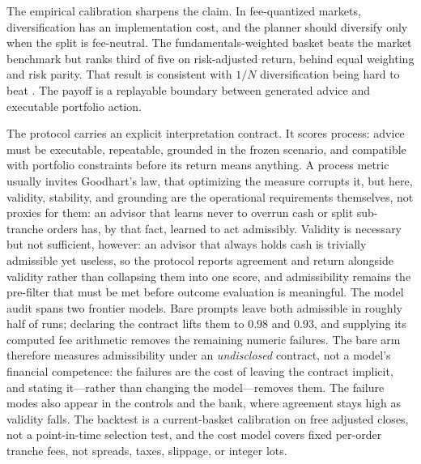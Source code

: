 \documentclass[sigconf,review,anonymous]{acmart}
\begin{document}
The empirical calibration sharpens the claim. In fee-quantized markets, diversification has an implementation cost, and the planner should diversify only when the split is fee-neutral. The fundamentals-weighted basket beats the market benchmark but ranks third of five on risk-adjusted return, behind equal weighting and risk parity. That result is consistent with $1/N$ diversification being hard to beat \cite{demiguel2009naive}. The payoff is a replayable boundary between generated advice and executable portfolio action.

The protocol carries an explicit interpretation contract. It scores process: advice must be executable, repeatable, grounded in the frozen scenario, and compatible with portfolio constraints before its return means anything. A process metric usually invites Goodhart's law, that optimizing the measure corrupts it, but here, validity, stability, and grounding are the operational requirements themselves, not proxies for them: an advisor that learns never to overrun cash or split sub-tranche orders has, by that fact, learned to act admissibly. Validity is necessary but not sufficient, however: an advisor that always holds cash is trivially admissible yet useless, so the protocol reports agreement and return alongside validity rather than collapsing them into one score, and admissibility remains the pre-filter that must be met before outcome evaluation is meaningful. The model audit spans two frontier models. Bare prompts leave both admissible in roughly half of runs; declaring the contract lifts them to $0.98$ and $0.93$, and supplying its computed fee arithmetic removes the remaining numeric failures. The bare arm therefore measures admissibility under an \emph{undisclosed} contract, not a model's financial competence: the failures are the cost of leaving the contract implicit, and stating it---rather than changing the model---removes them. The failure modes also appear in the controls and the bank, where agreement stays high as validity falls. The backtest is a current-basket calibration on free adjusted closes, not a point-in-time selection test, and the cost model covers fixed per-order tranche fees, not spreads, taxes, slippage, or integer lots.
\end{document}
